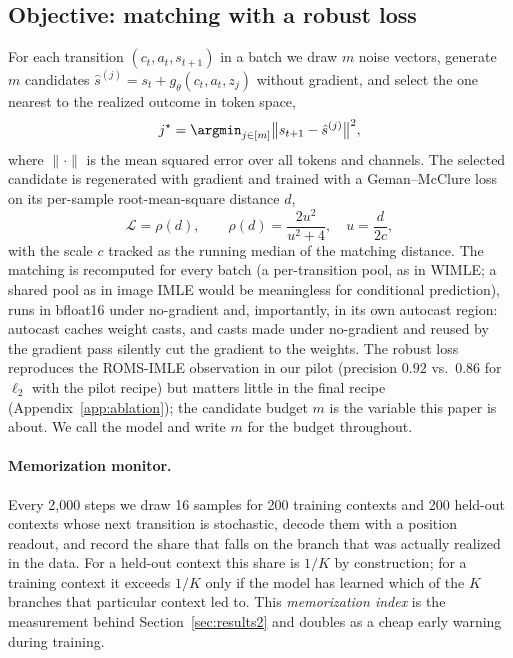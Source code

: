 \subsection{Objective: \nom{} matching with a robust loss}
\label{sec:objective}
For each transition $(c_t, a_t, s_{t+1})$ in a batch we draw $m$ noise vectors, generate $m$ candidates $\hat{s}^{(j)} = s_t + g_\theta(c_t, a_t, z_j)$ without gradient, and select the one nearest to the realized outcome in token space,
\begin{equation}
j^\star = \argmin_{j \in [m]} \big\| s_{t+1} - \hat{s}^{(j)} \big\|^2 ,
\label{eq:match}
\end{equation}
where $\|\cdot\|$ is the mean squared error over all tokens and channels. The selected candidate is regenerated with gradient and trained with a Geman--McClure loss \citep{geman1987statistical} on its per-sample root-mean-square distance $d$,
\begin{equation}
\mathcal{L} = \rho(d),\qquad \rho(d) = \frac{2u^2}{u^2 + 4},\quad u = \frac{d}{2c},
\label{eq:gm}
\end{equation}
with the scale $c$ tracked as the running median of the matching distance. The matching is recomputed for every batch (a per-transition pool, as in WIMLE; a shared pool as in image IMLE would be meaningless for conditional prediction), runs in bfloat16 under no-gradient and, importantly, in its own autocast region: autocast caches weight casts, and casts made under no-gradient and reused by the gradient pass silently cut the gradient to the weights. The robust loss reproduces the ROMS-IMLE observation in our pilot (precision $0.92$ vs.\ $0.86$ for $\ell_2$ with the pilot recipe) but matters little in the final recipe (Appendix~\ref{app:ablation}); the candidate budget $m$ is the variable this paper is about. We call the model \imlewm{} and write $m$ for the budget throughout.

\paragraph{Memorization monitor.}
Every 2{,}000 steps we draw 16 samples for 200 training contexts and 200 held-out contexts whose next transition is stochastic, decode them with a position readout, and record the share that falls on the branch that was actually realized in the data. For a held-out context this share is $1/K$ by construction; for a training context it exceeds $1/K$ only if the model has learned which of the $K$ branches that particular context led to. This \emph{memorization index} is the measurement behind Section~\ref{sec:results2} and doubles as a cheap early warning during training.


